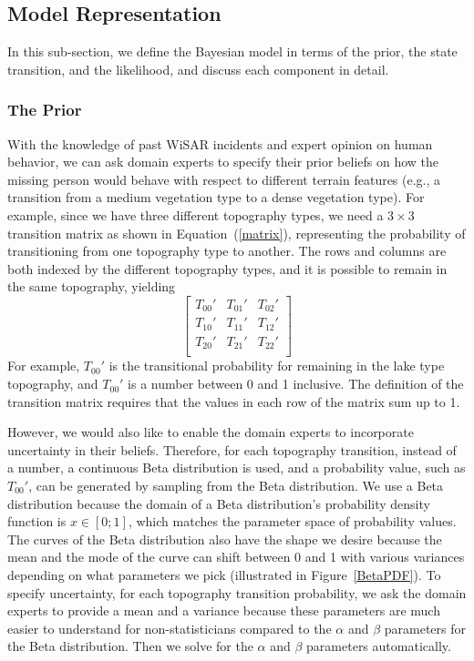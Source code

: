 \documentclass[smallextended,natbib]{svjour3}
\begin{document}
\subsection{Model Representation}
\label{sec:3.4}

In this sub-section, we define the Bayesian model in terms of the prior, the state transition, and the likelihood, and discuss each component in detail.

\subsubsection{The Prior}
\label{sec:3.4.1}

With the knowledge of past WiSAR incidents and expert opinion on human behavior, we can ask domain experts to specify their prior beliefs on how the missing person would behave with respect to different terrain features (e.g., a transition from a medium vegetation type to a dense vegetation type). For example, since we have three different topography types, we need a $3 \times 3$ transition matrix as shown in Equation~(\ref{matrix}), representing the probability of transitioning from one topography type to another. The rows and columns are both indexed by the different topography types, and it is possible to remain in the same topography, yielding
\begin{equation}
\left[
\begin{array}{ccc}
T_{00}' & T_{01}' & T_{02}'\\
T_{10}' & T_{11}' & T_{12}'\\
T_{20}' & T_{21}' & T_{22}'\\
\end{array}
\right]
\label{matrix}
\end{equation}
For example, $T_{00}'$ is the transitional probability for remaining in the lake type topography, and $T_{00}'$ is a number between 0 and 1 inclusive. The definition of the transition matrix requires that the values in each row of the matrix sum up to 1.

However, we would also like to enable the domain experts to incorporate uncertainty in their beliefs. Therefore, for each topography transition, instead of a number, a continuous Beta distribution is used, and a probability value, such as $T_{00}'$, can be generated by sampling from the Beta distribution. We use a Beta distribution because the domain of a Beta distribution's probability density function is $x \in [0; 1]$, which matches the parameter space of probability values. The curves of the Beta distribution also have the shape we desire because the mean and the mode of the curve can shift between 0 and 1 with various variances depending on what parameters we pick (illustrated in Figure~\ref{BetaPDF}). To specify uncertainty, for each topography transition probability, we ask the domain experts to provide a mean and a variance because these parameters are much easier to understand for non-statisticians compared to the $\alpha$ and $\beta$ parameters for the Beta distribution. Then we solve for the $\alpha$ and $\beta$ parameters automatically.
\end{document}
